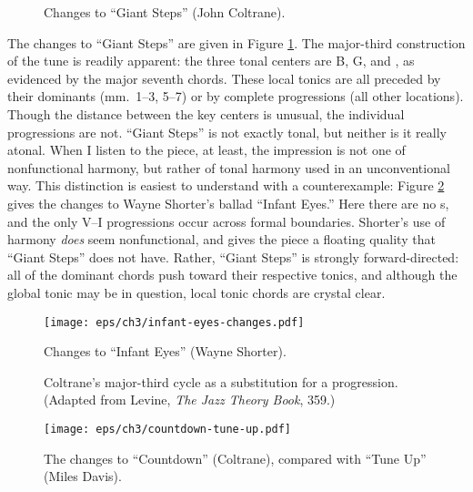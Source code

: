 \begin{figure}[tbp]
  \caption{Changes to ``Giant Steps'' (John Coltrane).}
  \label{maj3:giant-steps-changes}
\end{figure}

The changes to ``Giant Steps'' are given in Figure
\ref{maj3:giant-steps-changes}. The major-third construction of the tune is
readily apparent: the three tonal centers are B, G, and \Eflat, as evidenced
by the major seventh chords. These local tonics are all preceded by their
dominants (mm.~1--3, 5--7) or by complete \tf progressions (all other
locations). Though the distance between the key centers is unusual, the
individual progressions are not. ``Giant Steps'' is not exactly
tonal, but neither is it really atonal. When I listen to the piece, at least,
the impression is not one of nonfunctional harmony, but rather of
tonal harmony used in an unconventional way. This distinction is easiest to understand
with a counterexample: Figure \ref{maj3:infant-eyes-changes} gives the changes to
Wayne Shorter's ballad ``Infant Eyes.'' Here there are no \tf{}s,
and the only V--I progressions occur across formal boundaries. Shorter's use
of harmony \emph{does} seem nonfunctional, and gives the piece a floating
quality that ``Giant Steps'' does not have. Rather, ``Giant Steps'' is
strongly forward-directed: all of the dominant chords push toward their
respective tonics, and although the global tonic may be in question, local
tonic chords are crystal clear.

\begin{figure}[tbp]
  \hspace{6em}\texttt{[image: eps/ch3/infant-eyes-changes.pdf]}
  \caption{Changes to ``Infant Eyes'' (Wayne Shorter).}
  \label{maj3:infant-eyes-changes}
\end{figure}

\begin{figure}[tbp]
  \caption[Coltrane's major-third cycle as a substitution for a \tfo
    progression.]{Coltrane's major-third cycle as a substitution for a \tfo
    progression. (Adapted from Levine, \emph{The Jazz Theory Book}, 359.)}
  \label{maj3:coltrane-substitution}
\end{figure}

\begin{figure}[tbp]
  \hspace{1em}\texttt{[image: eps/ch3/countdown-tune-up.pdf]}
  \caption{The changes to ``Countdown'' (Coltrane), compared with
    ``Tune Up'' (Miles Davis).}
  \label{maj3:countdown-tune-up}
\end{figure}

